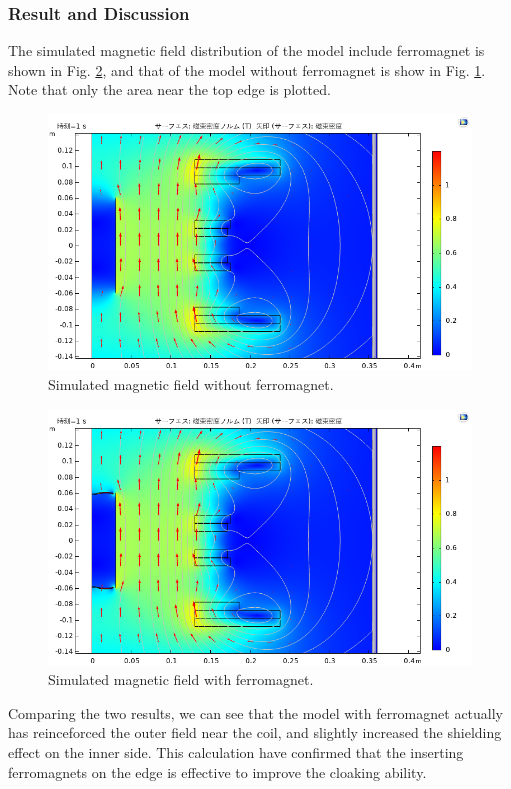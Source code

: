 \subsubsection{Result and Discussion}
The simulated magnetic field distribution of the model include ferromagnet is shown in Fig. \ref{fig:simulation_withFM},
and that of the model without ferromagnet is show in Fig. \ref{fig:simulation_withoutFM}.
Note that only the area near the top edge is plotted.
\begin{figure}[H]
  \includegraphics[width=17cm, bb=9 9 900 530]{./section3Effectiveness/BnormDistributionInMRICoilWithoutFM.png}
  \caption{Simulated magnetic field without ferromagnet.}
  \label{fig:simulation_withoutFM}
\end{figure}
\begin{figure}[H]
  \includegraphics[width=17cm, bb=9 9 900 500]{./section3Effectiveness/BnormDistributionInMRICoilWithFM.png}
  \caption{Simulated magnetic field with ferromagnet.}
  \label{fig:simulation_withFM}
\end{figure}
Comparing the two results,
we can see that the model with ferromagnet actually has reinceforced the outer field near the coil,
and slightly increased the shielding effect on the inner side.
This calculation have confirmed that the inserting ferromagnets on the edge is effective to improve the cloaking ability.

